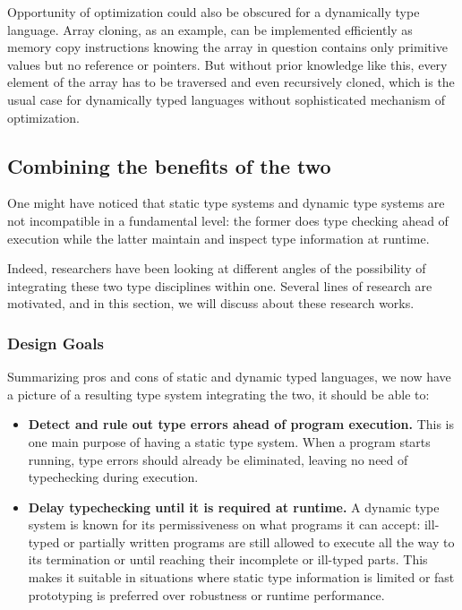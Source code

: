 Opportunity of optimization could also be obscured for a dynamically type language.
Array cloning, as an example,
can be implemented efficiently as memory copy instructions
knowing the array in question contains only primitive values but no reference or pointers.
But without prior knowledge like this,
every element of the array has to be traversed and even recursively cloned,
which is the usual case for dynamically typed languages without sophisticated mechanism
of optimization.

\subsection{Combining the benefits of the two}

One might have noticed that static type systems and dynamic type systems
are not incompatible in a fundamental level:
the former does type checking ahead of execution while
the latter maintain and inspect type information at runtime.

Indeed, researchers have been looking at different angles of
the possibility of integrating these two type disciplines within one.
Several lines of research are motivated,
and in this section, we will discuss about these research works.

\subsubsection{Design Goals}

Summarizing pros and cons of static and dynamic typed languages,
we now have a picture of a resulting type system integrating the two,
it should be able to:

\begin{itemize}
	\item \textbf{Detect and rule out type errors ahead of program execution.}
	This is one main purpose of having a static type system.
	When a program starts running, type errors should already be eliminated,
	leaving no need of typechecking during execution.

	\item \textbf{Delay typechecking until it is required at runtime.}
	A dynamic type system is known for its permissiveness on what programs it can accept:
	ill-typed or partially written programs are still allowed to execute
	all the way to its termination or until reaching their incomplete or ill-typed parts.
	This makes it suitable in situations where static type information
	is limited or fast prototyping is preferred over robustness or runtime performance.
\end{itemize}


